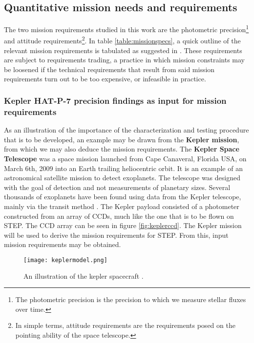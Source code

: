 \documentclass[../main.tex]{subfiles}
\begin{document}
	\subsection{Quantitative mission needs and requirements}\label{sec:missobj}
	
	The two mission requirements studied in this work are the photometric precision\footnote{The photometric precision is the precision to which we measure stellar fluxes over time.} and attitude requirements\footnote{In simple terms, attitude requirements are the requirements posed on the pointing ability of the space telescope.}. In table \ref{table:missionspecs}, a quick outline of the relevant mission requirements is tabulated as suggested in \cite{SMAD}. These requirements are subject to requirements trading, a practice in which mission constraints may be loosened if the technical requirements that result from said mission requirements turn out to be too expensive, or infeasible in practice. 
	
	\subsubsection{Kepler HAT-P-7 precision findings as input for mission requirements}\label{sec:intromissionreqspecification}
	
	As an illustration of the importance of the characterization and testing procedure that is to be developed, an example may be drawn from the \textbf{Kepler mission}, from which we may also deduce the mission requirements. 
	The \textbf{Kepler Space Telescope} was a space mission launched from Cape Canaveral, Florida USA, on March 6th, 2009 \cite{keplerlaunch} into an Earth trailing heliocentric orbit. It is an example of an astronomical satellite mission to detect exoplanets. The telescope was designed with the goal of detection and not measurements of planetary sizes. Several thousands of exoplanets have been found using data from the Kepler telescope, mainly via the transit method \cite{planetarchive}. The Kepler payload consisted of a photometer constructed from an array of CCDs, much like the one that is to be flown on STEP. The CCD array can be seen in figure \ref{fig:keplerccd}. The Kepler mission will be used to derive the mission requirements for STEP. From this, input mission requirements may be obtained. 
	
	\begin{figure}
		\centering			
		\texttt{[image: keplermodel.png]}
		\caption{An illustration of the kepler spacecraft \cite{2016ksci.rept....1V}.}
		\label{fig:keplermodel}
	\end{figure} 
	
\end{document}
